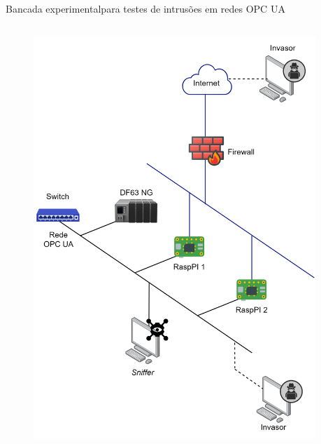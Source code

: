 \documentclass{uspBeamer}
\begin{document}
    \begin{frame}{Bancada experimental}{para testes de intrusões em redes OPC UA}
        \begin{columns}
            \begin{column}{.6\textwidth}
                \begin{figure}
                    \includegraphics[height=0.8\textheight]{bancada.png}
                \end{figure}
            \end{column}
            \begin{column}{.4\textwidth}
\end{column}
\end{columns}
\end{frame}
\end{document}
